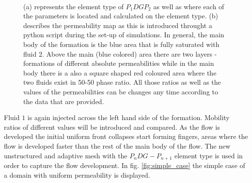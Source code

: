 \documentclass[preprint,authoryear,12pt]{elsarticle}
\begin{document}

\begin{figure}[h]
\begin{center}
%
\\
\end{center}
\caption{(a) represents the element type of $P_{1}DGP_{2}$ as well as where each of the parameters is located and calculated on the element type. (b) describes the permeability map as this is introduced throught a python script during the set-up of simulations. In general, the main body of the formation is the blue area that is fully saturated with fluid $2$. Above the main (blue colored) area there are two layers - formations of different absolute permeabilities while in the main body there is a also a square shaped red coloured area where the two fluids exist in 50-50 phase ratio. All those ratios as well as the values of the permeabilities can be changes any time according to the data that are provided.   }
\label{fig:elem_type_perm_map}
\end{figure}

Fluid $1$ is again injected across the left hand side of the formation. Mobility ratios of different values will be introduced and compared. As the flow is developed the initial uniform front collapses start forming fingers, areas where the flow is developed faster than the rest of the main body of the flow. The new unstructured and adaptive mesh with the $P_{n}DG-P_{n+1}$ element type is used in order to capture the flow development. In fig. \ref{fig:simple_case} the simple case of a domain with uniform permeability is displayed.
\end{document}
